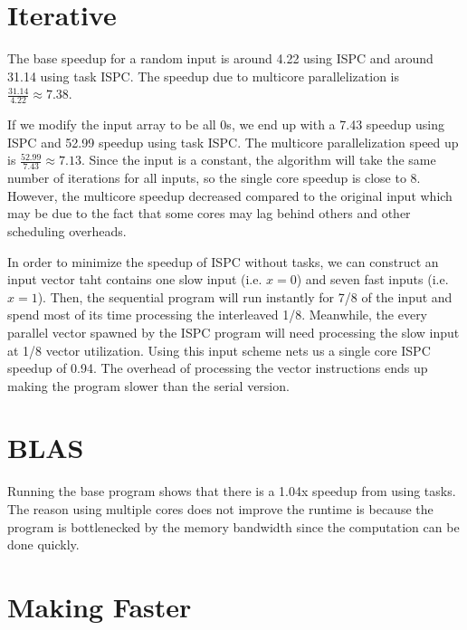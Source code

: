 \documentclass[11pt]{article}
\begin{document}

\section{Iterative }

The base speedup for a random input is around 4.22 using ISPC and around 31.14
using task ISPC. The speedup due to multicore parallelization is
$\frac{31.14}{4.22} \approx 7.38$.

\smallskip
If we modify the input array to be all 0s, we end up with a 7.43 speedup using
ISPC and 52.99 speedup using task ISPC. The multicore parallelization speed up
is $\frac{52.99}{7.43} \approx 7.13$. Since the input is a constant, the
 algorithm will take the same number of iterations for all inputs, so
the single core speedup is close to 8. However, the multicore speedup decreased
compared to the original input which may be due to the fact that some cores may
lag behind others and other scheduling overheads.

\smallskip
In order to minimize the speedup of ISPC without tasks, we can construct an
input vector taht contains one slow input (i.e. $x=0$) and seven fast inputs
(i.e. $x=1$). Then, the sequential program will run instantly for 7/8 of the
input and spend most of its time processing the interleaved 1/8. Meanwhile, the
every parallel vector spawned by the ISPC program will need processing the slow
input at 1/8 vector utilization. Using this input scheme nets us a single core
ISPC speedup of 0.94. The overhead of processing the vector instructions ends up
making the program slower than the serial version.


\section{BLAS }

Running the base  program shows that there is a 1.04x speedup from
using tasks. The reason using multiple cores does not improve the runtime is
because the program is bottlenecked by the memory bandwidth since the
computation can be done quickly. %


\section{Making  Faster}
\end{document}
